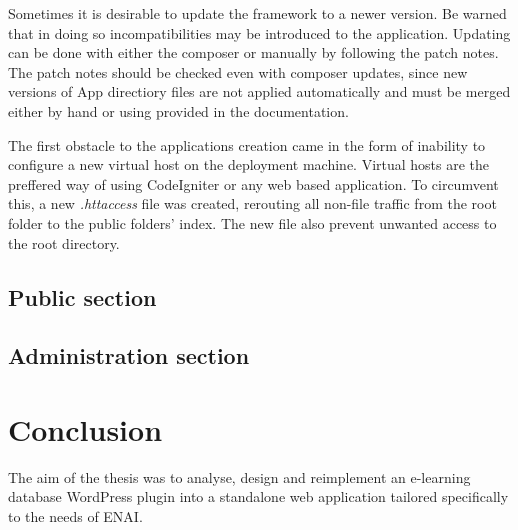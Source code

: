 \documentclass[
  digital,     %
  oneside,     %
  nosansbold,  %
  colorbold, %
  lof,         %
  lot,         %
]{fithesis4}
\begin{document}
Sometimes it is desirable to update the framework to a newer version. Be warned that in doing so incompatibilities may be introduced to the application. Updating can be done with either the composer or manually by following the patch notes. The patch notes should be checked even with composer updates, since new versions of App directiory files are not applied automatically and must be merged either by hand or using provided in the documentation.

The first obstacle to the applications creation came in the form of inability to configure a new virtual host on the deployment machine. Virtual hosts are the preffered way of using CodeIgniter or any web based application. To circumvent this, a new \textit{.httaccess} file was created, rerouting all non-file traffic from the root folder to the public folders' index. The new file also prevent unwanted access to the root directory.

\shorthandoff{-}
\shorthandon{-}

\section{Public section}

\section{Administration section}

\chapter{Conclusion}

The aim of the thesis was to analyse, design and reimplement an e-learning database WordPress plugin into a standalone web application tailored specifically to the needs of ENAI.
\end{document}

